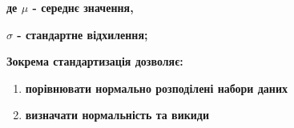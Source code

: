 \documentclass[12pt]{extarticle}
\begin{document}
\begin{enumerate}
\textbf{де $\mu$ - середнє значення, }

\textbf{$\sigma$ - стандартне відхилення; }


\textbf{Зокрема стандартизація дозволяє: }
	\begin{enumerate}
	
	\item \textbf{порівнювати нормально розподілені набори даних}
	
	\item \textbf{визначати нормальність та викиди}
	
	
	
	\end{enumerate}

\end{enumerate}
\end{document}
